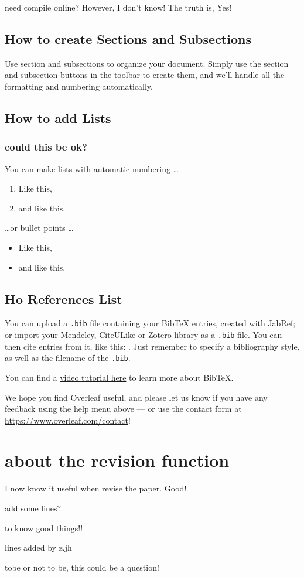 \documentclass[a4paper]{article}
\begin{document}
need compile online? However, I don't know!
The truth is, Yes!


\subsection{How to create Sections and Subsections}

Use section and subsections to organize your document. Simply use the section and subsection buttons in the toolbar to create them, and we'll handle all the formatting and numbering automatically.

\subsection{How to add Lists}
\subsubsection{could this be ok?}

You can make lists with automatic numbering \dots

\begin{enumerate}
\item Like this,
\item and like this.
\end{enumerate}
\dots or bullet points \dots
\begin{itemize}
\item Like this,
\item and like this.
\end{itemize}

\subsection{Ho References List}

You can upload a \verb|.bib| file containing your BibTeX entries, created with JabRef; or import your \href{https://www.overleaf.com/blog/184}{Mendeley}, CiteULike or Zotero library as a \verb|.bib| file. You can then cite entries from it, like this: \cite{greenwade93}. Just remember to specify a bibliography style, as well as the filename of the \verb|.bib|.

You can find a \href{https://www.overleaf.com/help/97-how-to-include-a-bibliography-using-bibtex}{video tutorial here} to learn more about BibTeX.

We hope you find Overleaf useful, and please let us know if you have any feedback using the help menu above --- or use the contact form at \url{https://www.overleaf.com/contact}!
\section{about the revision function}

I now know it  useful when revise the paper. Good!

add some lines?

to know good things!!

lines added by z.jh


tobe or not to be, this could be a question!





\end{document}
